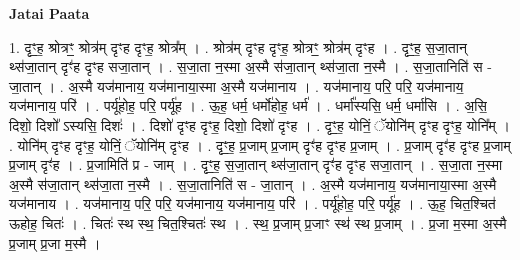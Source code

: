 \documentclass[17pt]{extarticle}
\begin{document}
\textbf{Jatai Paata} \newline

1. दृꣳ॒॒ह॒ श्रोत्रꣳ॒॒ श्रोत्र॑म् दृꣳह दृꣳह॒ श्रोत्र᳚म् । . श्रोत्र॑म् दृꣳह दृꣳह॒ श्रोत्रꣳ॒॒ श्रोत्र॑म् दृꣳह । . दृꣳ॒॒ह॒ स॒जा॒तान् थ्स॑जा॒तान् दृꣳ॑ह दृꣳह सजा॒तान् । . स॒जा॒ता न॒स्मा अ॒स्मै स॑जा॒तान् थ्स॑जा॒ता न॒स्मै । . स॒जा॒तानिति॑ स - जा॒तान् । . अ॒स्मै यज॑मानाय॒ यज॑मानाया॒स्मा अ॒स्मै यज॑मानाय । . यज॑मानाय॒ परि॒ परि॒ यज॑मानाय॒ यज॑मानाय॒ परि॑ । . पर्यू॑होह॒ परि॒ पर्यू॑ह । . ऊ॒ह॒ धर्म॒ धर्मो॑होह॒ धर्म॑ । . धर्मा᳚स्यसि॒ धर्म॒ धर्मा॑सि । . अ॒सि॒ दिशो॒ दिशो᳚ ऽस्यसि॒ दिशः॑ । . दिशो॑ दृꣳह दृꣳह॒ दिशो॒ दिशो॑ दृꣳह । . दृꣳ॒॒ह॒ योनिं॒ ॅयोनि॑म् दृꣳह दृꣳह॒ योनि᳚म् । . योनि॑म् दृꣳह दृꣳह॒ योनिं॒ ॅयोनि॑म् दृꣳह । . दृꣳ॒॒ह॒ प्र॒जाम् प्र॒जाम् दृꣳ॑ह दृꣳह प्र॒जाम् । . प्र॒जाम् दृꣳ॑ह दृꣳह प्र॒जाम् प्र॒जाम् दृꣳ॑ह । . प्र॒जामिति॑ प्र - जाम् । . दृꣳ॒॒ह॒ स॒जा॒तान् थ्स॑जा॒तान् दृꣳ॑ह दृꣳह सजा॒तान् । . स॒जा॒ता न॒स्मा अ॒स्मै स॑जा॒तान् थ्स॑जा॒ता न॒स्मै । . स॒जा॒तानिति॑ स - जा॒तान् । . अ॒स्मै यज॑मानाय॒ यज॑मानाया॒स्मा अ॒स्मै यज॑मानाय । . यज॑मानाय॒ परि॒ परि॒ यज॑मानाय॒ यज॑मानाय॒ परि॑ । . पर्यू॑होह॒ परि॒ पर्यू॑ह । . ऊ॒ह॒ चित॒श्चित॑ ऊहोह॒ चितः॑ । . चितः॑ स्थ स्थ॒ चित॒श्चितः॑ स्थ । . स्थ॒ प्र॒जाम् प्र॒जाꣳ स्थ॑ स्थ प्र॒जाम् । . प्र॒जा म॒स्मा अ॒स्मै प्र॒जाम् प्र॒जा म॒स्मै । \newline
\end{document}
